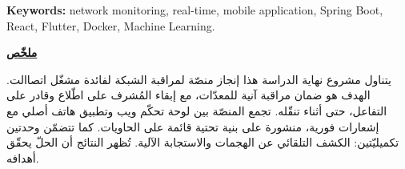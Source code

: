\documentclass[12pt,a4paper]{report}
\begin{document}
\textbf{Keywords:} network monitoring, real-time, mobile application, Spring Boot, React, Flutter, Docker, Machine Learning.

\vspace{0.45cm}
\begin{Arabic}
\noindent\underline{\textbf{ملخّص}}\par
\noindent يتناول مشروع نهاية الدراسة هذا إنجاز منصّة لمراقبة الشبكة لفائدة مشغّل اتصاالت. الهدف هو ضمان مراقبة آنية للمعدّات، مع إبقاء المُشرف على اطّلاع وقادر على التفاعل، حتى أثناء تنقّله. تجمع المنصّة بين لوحة تحكّم ويب وتطبيق هاتف أصلي مع إشعارات فورية، منشورة على بنية تحتية قائمة على الحاويات. كما تتضمّن وحدتين تكميليّتين: الكشف التلقائي عن الهجمات والاستجابة الآلية. تُظهر النتائج أن الحلّ يحقّق أهدافه.\par
\end{Arabic}
\clearpage
\end{document}
